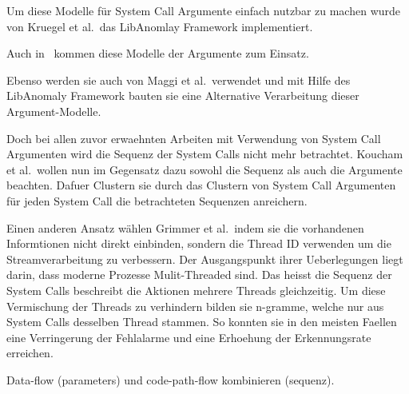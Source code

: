         Um diese Modelle für System Call Argumente einfach nutzbar zu machen wurde von Kruegel et al.\ das LibAnomlay Framework implementiert.~\cite{ARGUMENTS}

        Auch in~\cite{ARGUMENTS2} kommen diese Modelle der Argumente zum Einsatz.
        
        Ebenso werden sie auch von Maggi et al.\ verwendet und mit Hilfe des LibAnomaly Framework bauten sie eine Alternative Verarbeitung dieser Argument-Modelle.~\cite{MAGGI}

        Doch bei allen zuvor erwaehnten Arbeiten mit Verwendung von System Call Argumenten wird die Sequenz der System Calls nicht mehr betrachtet.
        Koucham et al.\ wollen nun im Gegensatz dazu sowohl die Sequenz als auch die Argumente beachten.
        Dafuer Clustern sie durch das Clustern von System Call Argumenten für jeden System Call die betrachteten Sequenzen anreichern.
        ~\cite{ARGUMENTCLUSTERKOUCHAM2015}

        Einen anderen Ansatz wählen Grimmer et al.\ indem sie die vorhandenen Informtionen nicht direkt einbinden, sondern die Thread ID verwenden um die Streamverarbeitung zu verbessern.
        Der Ausgangspunkt ihrer Ueberlegungen liegt darin, dass moderne Prozesse Mulit-Threaded sind.
        Das heisst die Sequenz der System Calls beschreibt die Aktionen mehrere Threads gleichzeitig.
        Um diese Vermischung der Threads zu verhindern bilden sie n-gramme, welche nur aus System Calls desselben Thread stammen.
        So konnten sie in den meisten Faellen eine Verringerung der Fehlalarme und eine Erhoehung der Erkennungsrate erreichen.\cite{IDSTHREADGRIMMER2021}


        Data-flow (parameters) und code-path-flow kombinieren (sequenz).


